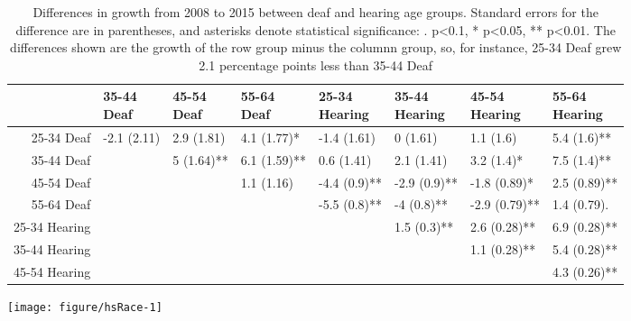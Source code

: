 \documentclass{article}\usepackage[]{graphicx}\usepackage[]{color}
\makeatletter
\def\maxwidth{ %
  \ifdim\Gin@nat@width>\linewidth
    \linewidth
  \else
    \Gin@nat@width
  \fi
}
\newenvironment{knitrout}{}{} %
\makeatother
\begin{document}
\begin{table}[ht]
\centering
\begingroup\small
\begin{tabular}{rlllllll}
  \hline
 & \thead{35-44\\Deaf} & \thead{45-54\\Deaf} & \thead{55-64\\Deaf} & \thead{25-34\\Hearing} & \thead{35-44\\Hearing} & \thead{45-54\\Hearing} & \thead{55-64\\Hearing} \\
  \hline
25-34 Deaf & -2.1 (2.11) & 2.9 (1.81) & 4.1 (1.77)* & -1.4 (1.61) & 0 (1.61) & 1.1 (1.6) & 5.4 (1.6)** \\
  35-44 Deaf &  & 5 (1.64)** & 6.1 (1.59)** & 0.6 (1.41) & 2.1 (1.41) & 3.2 (1.4)* & 7.5 (1.4)** \\
  45-54 Deaf &  &  & 1.1 (1.16) & -4.4 (0.9)** & -2.9 (0.9)** & -1.8 (0.89)* & 2.5 (0.89)** \\
  55-64 Deaf &  &  &  & -5.5 (0.8)** & -4 (0.8)** & -2.9 (0.79)** & 1.4 (0.79). \\
  25-34 Hearing &  &  &  &  & 1.5 (0.3)** & 2.6 (0.28)** & 6.9 (0.28)** \\
  35-44 Hearing &  &  &  &  &  & 1.1 (0.28)** & 5.4 (0.28)** \\
  45-54 Hearing &  &  &  &  &  &  & 4.3 (0.26)** \\
   \hline
\end{tabular}
\endgroup
\caption{Differences in growth from 2008 to 2015 between deaf and hearing age
groups. Standard errors for the difference are in parentheses, and asterisks denote statistical significance: . p<0.1, * p<0.05, ** p<0.01. The differences shown are the growth of the row group minus the columnn group, so, for instance, 25-34 Deaf grew 2.1 percentage points less than 35-44 Deaf}
\label{tab:bachAgeGrowth}
\end{table}



\clearpage
\begin{center}
\begin{knitrout}
\color{fgcolor}
\texttt{[image: figure/hsRace-1]}

\end{knitrout}
\end{center}
\end{document}
